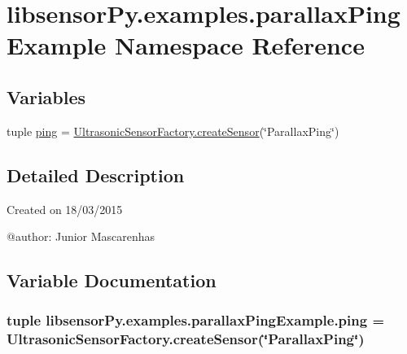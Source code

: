 \hypertarget{namespacelibsensorPy_1_1examples_1_1parallaxPingExample}{}\section{libsensor\+Py.\+examples.\+parallax\+Ping\+Example Namespace Reference}
\label{namespacelibsensorPy_1_1examples_1_1parallaxPingExample}
\subsection*{Variables}
\begin{DoxyCompactItemize}
\item 
tuple \hyperlink{namespacelibsensorPy_1_1examples_1_1parallaxPingExample_a986ae531bf760b33b37e74f368b9caf2}{ping} = \hyperlink{classconcretefactory_1_1ultrasonicSensorFactory_1_1UltrasonicSensorFactory_ade21ba1ce348eb9e5cf8eee3fda4a773}{Ultrasonic\+Sensor\+Factory.\+create\+Sensor}(\char`\"{}Parallax\+Ping\char`\"{})
\end{DoxyCompactItemize}


\subsection{Detailed Description}
\begin{DoxyVerb}Created on 18/03/2015

@author: Junior Mascarenhas
\end{DoxyVerb}
 

\subsection{Variable Documentation}
\hypertarget{namespacelibsensorPy_1_1examples_1_1parallaxPingExample_a986ae531bf760b33b37e74f368b9caf2}{}
\subsubsection[{ping}]{\setlength{\rightskip}{0pt plus 5cm}tuple libsensor\+Py.\+examples.\+parallax\+Ping\+Example.\+ping = {\bf Ultrasonic\+Sensor\+Factory.\+create\+Sensor}(\char`\"{}Parallax\+Ping\char`\"{})}\label{namespacelibsensorPy_1_1examples_1_1parallaxPingExample_a986ae531bf760b33b37e74f368b9caf2}
